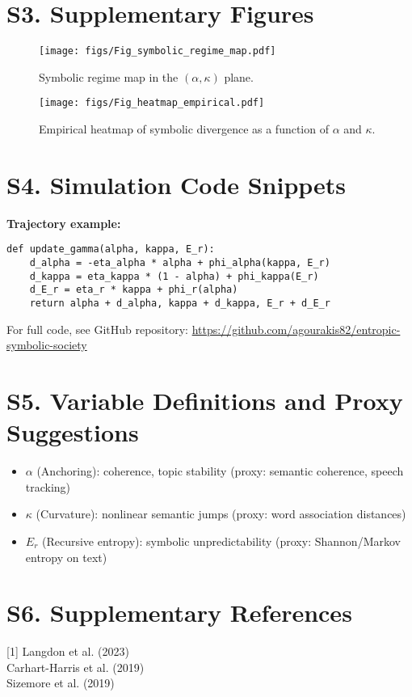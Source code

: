\documentclass[12pt]{article}
\begin{document}
\section*{S3. Supplementary Figures}

\begin{figure}[h]
\centering
\texttt{[image: figs/Fig\_symbolic\_regime\_map.pdf]}
\caption{Symbolic regime map in the $(\alpha, \kappa)$ plane.}
\end{figure}

\begin{figure}[h]
\centering
\texttt{[image: figs/Fig\_heatmap\_empirical.pdf]}
\caption{Empirical heatmap of symbolic divergence as a function of $\alpha$ and $\kappa$.}
\end{figure}

\section*{S4. Simulation Code Snippets}

\textbf{Trajectory example:}

\begin{verbatim}
def update_gamma(alpha, kappa, E_r):
    d_alpha = -eta_alpha * alpha + phi_alpha(kappa, E_r)
    d_kappa = eta_kappa * (1 - alpha) + phi_kappa(E_r)
    d_E_r = eta_r * kappa + phi_r(alpha)
    return alpha + d_alpha, kappa + d_kappa, E_r + d_E_r
\end{verbatim}

For full code, see GitHub repository: \url{https://github.com/agourakis82/entropic-symbolic-society}

\section*{S5. Variable Definitions and Proxy Suggestions}

\begin{itemize}
    \item $\alpha$ (Anchoring): coherence, topic stability (proxy: semantic coherence, speech tracking)
    \item $\kappa$ (Curvature): nonlinear semantic jumps (proxy: word association distances)
    \item $E_r$ (Recursive entropy): symbolic unpredictability (proxy: Shannon/Markov entropy on text)
\end{itemize}

\section*{S6. Supplementary References}

[1] Langdon et al. (2023) \\
[2] Carhart-Harris et al. (2019) \\
[3] Sizemore et al. (2019) \\
[... add as needed from main.bib ...] \\
\end{document}
